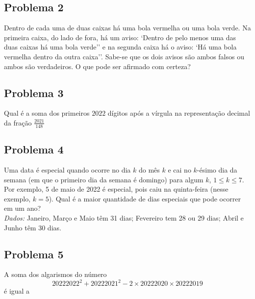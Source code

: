 \documentclass[12pt]{article}
\begin{document}
    \clearpage

    \subsection{Problema 2}
      \begin{tcolorbox}[statementbox]
        Dentro de cada uma de duas caixas há uma bola vermelha ou uma bola verde. Na primeira caixa, do lado de fora, há um aviso:
        `Dentro de pelo menos uma das duas caixas há uma bola verde'' e na segunda caixa há o aviso: `Há uma bola vermelha dentro da outra
        caixa''. Sabe-se que os dois avisos são ambos falsos ou ambos são verdadeiros. O que pode ser afirmado com certeza?
      \end{tcolorbox}

    \clearpage

    \subsection{Problema 3}
      \begin{tcolorbox}[statementbox]
        Qual é a soma dos primeiros $2022$ dígitos após a vírgula na representação decimal da fração $\frac{2021}{148}$
      \end{tcolorbox}

    \clearpage

    \subsection{Problema 4}
      \begin{tcolorbox}[statementbox]
        Uma data é especial quando ocorre no dia $k$ do mês $k$ e cai no $k$-ésimo dia da semana (em que o primeiro dia da semana é 
        domingo) para algum $k$, $1 \le k \le 7$. Por exemplo, 5 de maio de 2022 é especial, pois caiu na quinta-feira (nesse exemplo, $k=5$).
        Qual é a maior quantidade de dias especiais que pode ocorrer em um ano? \\
        \textit{Dados:} Janeiro, Março e Maio têm 31 dias; Fevereiro tem 28 ou 29 dias; Abril e Junho têm 30 dias.
      \end{tcolorbox}

    \clearpage

    \subsection{Problema 5}
      \begin{tcolorbox}[statementbox]
        A soma dos algarismos do número
        \[
          20222022^2 + 20222021^2 - 2 \times 20222020 \times 20222019
        \]
        é igual a
      \end{tcolorbox}
\end{document}
